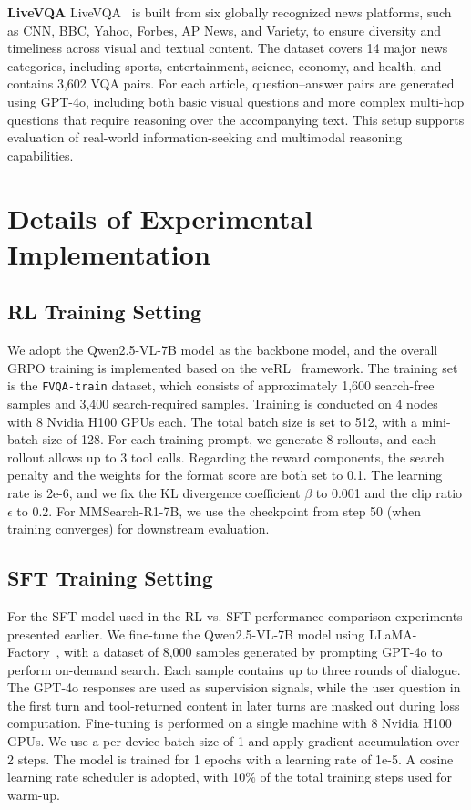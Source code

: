 \documentclass{article}
\begin{document}
\textbf{LiveVQA} LiveVQA~\cite{dataset/livevqa} is built from six globally recognized news platforms, such as CNN, BBC, Yahoo, Forbes, AP News, and Variety, to ensure diversity and timeliness across visual and textual content. The dataset covers 14 major news categories, including sports, entertainment, science, economy, and health, and contains 3,602 VQA pairs. For each article, question–answer pairs are generated using GPT-4o, including both basic visual questions and more complex multi-hop questions that require reasoning over the accompanying text. This setup supports evaluation of real-world information-seeking and multimodal reasoning capabilities. 

\section{Details of Experimental Implementation}
\label{appendix:exp-setups}

\subsection{RL Training Setting}
\label{appendix:exp-training-hyperparameters-rl}
We adopt the Qwen2.5-VL-7B model as the backbone model, and the overall GRPO training is implemented based on the veRL~\cite{code/verl} framework. The training set is the \texttt{FVQA-train} dataset, which consists of approximately 1,600 search-free samples and 3,400 search-required samples. Training is conducted on 4 nodes with 8 Nvidia H100 GPUs each. The total batch size is set to 512, with a mini-batch size of 128. For each training prompt, we generate 8 rollouts, and each rollout allows up to 3 tool calls. Regarding the reward components, the search penalty and the weights for the format score are both set to 0.1. The learning rate is 2e-6, and we fix the KL divergence coefficient $\beta$ to 0.001 and the clip ratio $\epsilon$ to 0.2. For MMSearch-R1-7B, we use the checkpoint from step 50 (when training converges) for downstream evaluation.
\subsection{SFT Training Setting}
\label{appendix:exp-training-hyperparameters-sft}
For the SFT model used in the RL vs. SFT performance comparison experiments presented earlier. We fine-tune the Qwen2.5-VL-7B model using LLaMA-Factory~\cite{code/llama-factory}, with a dataset of 8,000 samples generated by prompting GPT-4o to perform on-demand search. Each sample contains up to three rounds of dialogue. The GPT-4o responses are used as supervision signals, while the user question in the first turn and tool-returned content in later turns are masked out during loss computation.
Fine-tuning is performed on a single machine with 8 Nvidia H100 GPUs. We use a per-device batch size of 1 and apply gradient accumulation over 2 steps. The model is trained for 1 epochs with a learning rate of 1e-5. A cosine learning rate scheduler is adopted, with 10\% of the total training steps used for warm-up.
\end{document}
